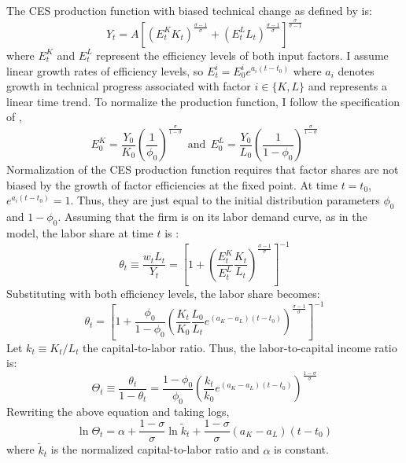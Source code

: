 The CES production function with biased technical change as defined by \cite{David1965} is:
	\begin{equation*}
		Y_t = A\left[\left(E_t^K K_t\right)^\frac{\sigma-1}{\sigma} + \left(E_t^L L_t\right)^\frac{\sigma-1}{\sigma}\right]^\frac{\sigma}{\sigma-1}
	\end{equation*}
where $E_t^K$ and $E^L_t$ represent the efficiency levels of both input factors. I assume linear growth rates of efficiency levels, so $E_t^i = E_0^i e^{a_i(t-t_0)}$ where $a_i$ denotes growth in technical progress associated with factor $i \in \lbrace K,L \rbrace$ and represents a linear time trend. To normalize the production function, I follow the specification of \cite{Klump2007},
	\begin{equation*}
		E_0^K = \frac{Y_0}{K_0}\left(\frac{1}{\phi_0}\right)^\frac{\sigma}{1-\sigma} ~~\text{and}~~
		E_0^L = \frac{Y_0}{L_0}\left(\frac{1}{1-\phi_0}\right)^\frac{\sigma}{1-\sigma}
	\end{equation*}
Normalization of the CES production function requires that factor shares are not biased by the growth of factor efficiencies at the fixed point. At time $t = t_0$, $e^{a_i(t-t_0)} = 1$.  Thus, they are just equal to the initial distribution parameters $\phi_0$ and $1-\phi_0$. Assuming that the firm is on its labor demand curve, as in the model, the labor share at time $t$ is :
	\begin{equation*}
		\theta_t \equiv \frac{w_t L_t}{Y_t} = \left[1 + \left(\frac{E_t^K}{E_t^L}\frac{K_t}{L_t}\right)^\frac{\sigma-1}{\sigma}\right]^{-1}
	\end{equation*}
Substituting with both efficiency levels, the labor share becomes:
	\begin{equation*}
		\theta_t = \left[1 + \frac{\phi_0}{1-\phi_0}\left(\frac{K_t}{K_0}\frac{L_0}{L_t} e^{(a_K-a_L)(t-t_0)} \right)^\frac{\sigma-1}{\sigma}\right]^{-1}
	\end{equation*}
Let $k_t \equiv K_t/L_t$ the capital-to-labor ratio. Thus, the labor-to-capital income ratio is:
	\begin{equation*}
		\Theta_t \equiv \frac{\theta_t}{1-\theta_t} = \frac{1-\phi_0}{\phi_0}\left(\frac{k_t}{k_0} e^{(a_K - a_L)(t-t_0)}\right)^{\frac{1-\sigma}{\sigma}}
	\end{equation*}
Rewriting the above equation and taking logs,
	\begin{equation} \label{eq:est_sigma}
		\ln \Theta_t = \alpha + \frac{1-\sigma}{\sigma} \ln \tilde{k}_t + \frac{1-\sigma}{\sigma}(a_K-a_L)\left(t-t_0\right)
	\end{equation}
where $\tilde{k}_t$ is the normalized capital-to-labor ratio and $\alpha$ is constant.

